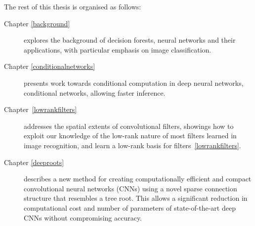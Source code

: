 \documentclass[thesis]{subfiles}
\begin{document}
The rest of this thesis is organised as follows:
\begin{description}
	\item[Chapter \ref{background}] explores the background of decision forests, neural networks and their applications, with particular emphasis on image classification.
	\item[Chapter \ref{conditionalnetworks}] presents work towards conditional computation in deep neural networks, conditional networks, allowing faster inference. 
	\item[Chapter~\ref{lowrankfilters}] addresses the spatial extents of convolutional filters, showings how to exploit our knowledge of the low-rank nature of most filters learned in image recognition, and learn a low-rank basis for filters~\ref{lowrankfilters}.
	\item[Chapter \ref{deeproots}] describes a new method for creating computationally efficient and compact convolutional neural networks (CNNs) using a novel sparse connection structure that resembles a tree root. This allows a significant reduction in computational cost and number of parameters of state-of-the-art deep CNNs without compromising accuracy.
	
\end{description}
\end{document}

